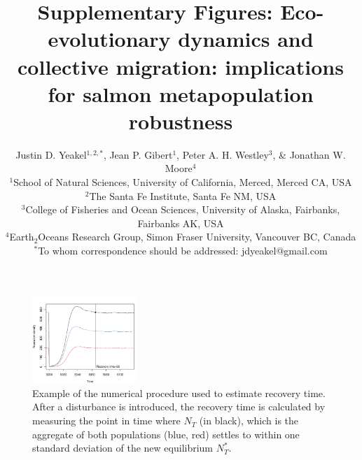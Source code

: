 \documentclass{revtex4}
\newcommand{\beginsupplement}{%
        \clearpage
        \setcounter{table}{0}
        \renewcommand{\thetable}{S\arabic{table}}%
        \setcounter{figure}{0}
        \renewcommand{\thefigure}{S\arabic{figure}}%
     }
\begin{document}
\title{Supplementary Figures: Eco-evolutionary dynamics and collective migration: implications for salmon metapopulation robustness}
\author{
Justin D. Yeakel${}^{1,2,*}$, Jean P. Gibert${}^{1}$, Peter A. H. Westley${}^{3}$, \& Jonathan W. Moore${}^{4}$ \\
${}^1$School of Natural Sciences, University of California, Merced, Merced CA, USA \\
${}^2$The Santa Fe Institute, Santa Fe NM, USA \\
${}^3$College of Fisheries and Ocean Sciences, University of Alaska, Fairbanks, Fairbanks AK, USA \\
${}^4$Earth${}_2$Oceans Research Group, Simon Fraser University, Vancouver BC, Canada \\
${}^*$To whom correspondence should be addressed: jdyeakel@gmail.com
}

\maketitle

\beginsupplement

\begin{figure}
  \captionsetup{justification=raggedright,
singlelinecheck=false
}
\centering
\includegraphics[width=0.35\textwidth]{fig_recovery.pdf}
\caption{
Example of the numerical procedure used to estimate recovery time. After a disturbance is introduced, the recovery time is calculated by measuring the point in time where $N_T$ (in black), which is the aggregate of both populations (blue, red) settles to within one standard deviation of the new equilibrium $N_T^*$. 
} \label{fig:recovery}
\end{figure}
\end{document}
